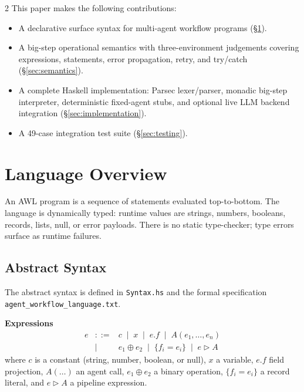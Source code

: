 \documentclass[10pt]{article}
\begin{document}
\begin{multicols}{2}
This paper makes the following contributions:

\begin{itemize}
  \item A declarative surface syntax for multi-agent workflow programs
        (\S\ref{sec:syntax}).
  \item A big-step operational semantics with three-environment judgements
        covering expressions, statements, error propagation, retry, and
        try/catch (\S\ref{sec:semantics}).
  \item A complete Haskell implementation: Parsec lexer/parser, monadic
        big-step interpreter, deterministic fixed-agent stubs, and optional
        live LLM backend integration (\S\ref{sec:implementation}).
  \item A 49-case integration test suite (\S\ref{sec:testing}).
\end{itemize}

\section{Language Overview}
\label{sec:syntax}

An AWL program is a sequence of statements evaluated top-to-bottom.
The language is dynamically typed: runtime values are strings, numbers,
booleans, records, lists, null, or error payloads.  There is no static
type-checker; type errors surface as runtime failures.

\subsection{Abstract Syntax}

The abstract syntax is defined in \texttt{Syntax.hs} and the formal
specification \texttt{agent\_workflow\_language.txt}.

\medskip
\noindent\textbf{Expressions}
\[
\begin{array}{rcl}
e & ::= & c \;\mid\; x \;\mid\; e.f \;\mid\; A(e_1,\ldots,e_n) \\
  & \mid & e_1 \oplus e_2 \;\mid\; \{f_i{=}e_i\} \;\mid\; e \rhd A
\end{array}
\]
where $c$ is a constant (string, number, boolean, or null), $x$ a variable,
$e.f$ field projection, $A(\ldots)$ an agent call, $e_1 \oplus e_2$ a
binary operation, $\{f_i{=}e_i\}$ a record literal, and $e \rhd A$
a pipeline expression.


\end{multicols}
\end{document}
